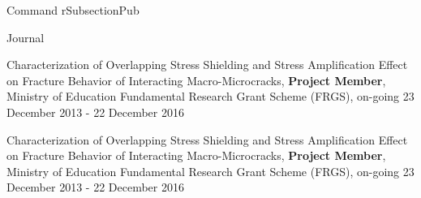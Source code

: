 \documentclass{resume} %
\begin{document}
\begin{rSection}{Command rSubsectionPub}
\begin{rSubsectionPub}{Journal}{}{}{}

\item Characterization of Overlapping Stress Shielding and Stress Amplification Effect on Fracture Behavior of Interacting Macro-Microcracks, 
\textbf{Project Member}, Ministry of Education Fundamental Research Grant Scheme (FRGS), on-going 23 December 2013 - 22 December 2016

\item Characterization of Overlapping Stress Shielding and Stress Amplification Effect on Fracture Behavior of Interacting Macro-Microcracks, 
\textbf{Project Member}, Ministry of Education Fundamental Research Grant Scheme (FRGS), on-going 23 December 2013 - 22 December 2016

\end{rSubsectionPub}
\end{rSection}







\end{document}
